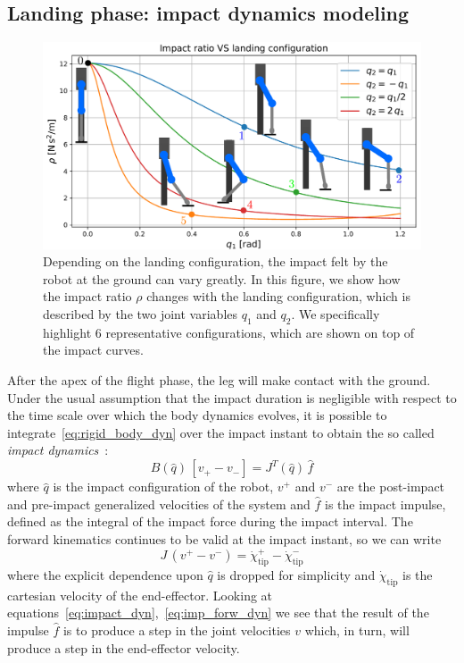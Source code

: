 \subsection{Landing phase: impact dynamics modeling}\label{subsec:impact_min}
\begin{figure}[t]
    \centering
    \includegraphics[width=1\columnwidth]{images/impact_ratio.pdf}
    \caption{Depending on the landing configuration, the impact felt by the robot at the ground can vary greatly. In this figure, we show how the impact ratio $\rho$ changes with the landing configuration, which is described by the two joint variables $q_1$ and $q_2$. We specifically highlight 6 representative configurations, which are shown on top of the impact curves.}
    \label{fig:impact_ratio}
\end{figure}
After the apex of the flight phase, the leg will make contact with the ground. Under the usual assumption that the impact duration is negligible with respect to the time scale over which the body dynamics evolves, it is possible to integrate~\eqref{eq:rigid_body_dyn} over the impact instant to obtain the so called \textit{impact dynamics}~\cite{impact_dyn::walker1990use}:
\begin{equation}
    \label{eq:impact_dyn}
B(\hat{q})\,\left[v_{+} - v_{-}\right] = J^{T}(\hat{q})\,\hat{f}
\end{equation}
where $\hat{q}$ is the impact configuration of the robot, $v^{+}$ and $v^{-}$ are the post-impact and pre-impact generalized velocities of the system and $\hat{f}$ is the impact impulse, defined as the integral of the impact force during the impact interval.
The forward kinematics continues to be valid at the impact instant, so we can write
\begin{equation}\label{eq:imp_forw_dyn}
    J\,\left( v^{+} - v^{-} \right) = \dot{\chi}_{\mathrm{tip}}^{+} - \dot{\chi}_{\mathrm{tip}}^{-}
\end{equation}
where the explicit dependence upon $\hat{q}$ is dropped for simplicity and $\dot{\chi}_{\mathrm{tip}}$ is the cartesian velocity of the end-effector. 
Looking at equations~\eqref{eq:impact_dyn},~\eqref{eq:imp_forw_dyn} we see that the result of the impulse $\hat{f}$ is to produce a step in the joint velocities $v$ which, in turn, will produce a step in the end-effector velocity. 

